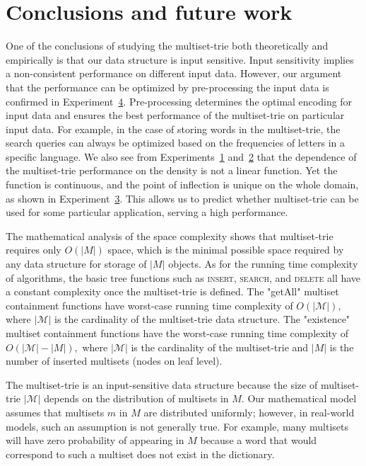 \section{Conclusions and future work} \label{c:conclusions}

%
One of the conclusions of studying the multiset-trie both theoretically and empirically is that our data structure is input sensitive. Input sensitivity implies a non-consistent performance on different input data. However, our argument that the performance can be optimized by pre-processing the input data is confirmed in  Experiment~\hyperref[ss:exp3]{4}. Pre-processing determines the optimal encoding for input data and ensures the best performance of the multiset-trie on particular input data. For example, in the case of storing words in the multiset-trie, the search queries can always be optimized based on the frequencies of letters in a specific language. We also see from Experiments~\hyperref[s:exp1]{1} and~\hyperref[s:exp2]{2} that the dependence of the multiset-trie performance on the density is not a linear function. Yet the function is continuous, and the point of inflection is unique on the whole domain, as shown in Experiment~\hyperref[s:exp3]{3}. This allows us to predict whether multiset-trie can be used for some particular application, serving a high performance. 

%
The mathematical analysis of the space complexity shows that multiset-trie requires only $O(|M|)$ space, which is the minimal possible space required by any data structure for storage of $|M|$ objects. As for the running time complexity of algorithms, the basic tree functions such as \textsc{insert}, \textsc{search}, and \textsc{delete} all have a constant complexity once the multiset-trie is defined. The "getAll" multiset containment functions have worst-case running time complexity of $O(|\mathcal{M}|),$ where $|\mathcal{M}|$ is the cardinality of the multiset-trie data structure. The "existence" multiset containment functions have the worst-case running time complexity of $O(|\mathcal{M}| - |M|),$ where $|\mathcal{M}|$ is the cardinality of the multiset-trie and $|M|$ is the number of inserted multisets (nodes on leaf level). 

The multiset-trie is an input-sensitive data structure because the size of multiset-trie $|\mathcal{M}|$ depends on the distribution of multisets in $M.$
Our mathematical model assumes that multisets $m$ in $M$ are distributed uniformly;  however, in real-world models, such an assumption is not generally true. 
For example, many multisets will have zero probability of appearing in $M$ because a word that would correspond to such a multiset does not exist in the dictionary.%

